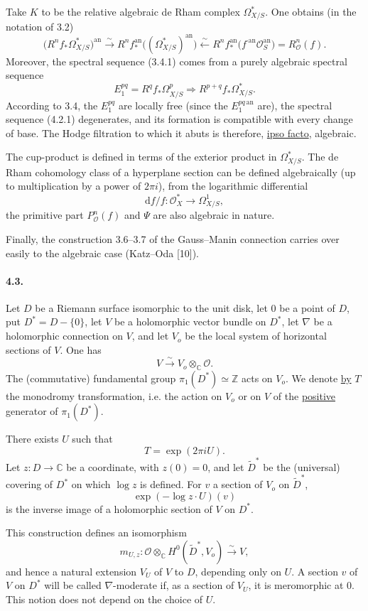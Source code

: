 \documentclass[10pt,leqno]{article}
\newcommand{\C}{\mathbb C}
\newcommand{\Z}{\mathbb Z}
\newcommand{\cO}{\mathcal O}
\theoremstyle{deligne}
\newcommand{\dd}{\mathrm d}
\renewcommand{\underline}[1]{\uline{#1}}
\begin{document}
Take $K$ to be the relative algebraic de Rham complex $\Omega^*_{X/S}$. One obtains (in the notation of 3.2)
\[
\bigl(R^n f_*\Omega^*_{X/S}\bigr)^{\mathrm{an}}
 \xrightarrow{\sim}
 R^n f_*^{\mathrm{an}}\bigl((\Omega^*_{X/S})^{\mathrm{an}}\bigr)
 \xleftarrow{\sim}
 R^n f_*^{\mathrm{an}}\bigl(f^{\cdot\mathrm{an}}\cO_S^{\mathrm{an}}\bigr)
 =
 R^n_{\cO}(f).
\]
Moreover, the spectral sequence (3.4.1) comes from a purely algebraic spectral sequence
\[
\tag{4.2.1}
E_1^{pq}=R^q f_*\Omega^p_{X/S}
\Longrightarrow
R^{p+q}f_*\Omega^*_{X/S}.
\]
According to 3.4, the $E_1^{pq}$ are locally free (since the $E_1^{pq\,\mathrm{an}}$ are), the spectral sequence (4.2.1) degenerates, and its formation is compatible with every change of base. The Hodge filtration to which it abuts is therefore, \underline{ipso facto}, algebraic.

The cup-product is defined in terms of the exterior product in $\Omega^*_{X/S}$. The de Rham cohomology class of a hyperplane section can be defined algebraically (up to multiplication by a power of $2\pi i$), from the logarithmic differential
\[
  \dd f/f:\cO_X^*\longrightarrow \Omega^1_{X/S},
\]
the primitive part $P^n_{\cO}(f)$ and $\Psi$ are also algebraic in nature.

Finally, the construction 3.6--3.7 of the Gauss--Manin connection carries over easily to the algebraic case (Katz--Oda [10]).

\paragraph{4.3.}
Let $D$ be a Riemann surface isomorphic to the unit disk, let $0$ be a point of $D$, put $D^*=D-\{0\}$, let $V$ be a holomorphic vector bundle on $D^*$, let $\nabla$ be a holomorphic connection on $V$, and let $V_o$ be the local system of horizontal sections of $V$. One has
\[
  V \xrightarrow{\sim} V_o\otimes_\C \cO .
\]
The (commutative) fundamental group $\pi_1(D^*)\simeq \Z$ acts on $V_o$. We denote \underline{by} $T$ the monodromy transformation, i.e. the action on $V_o$ or on $V$ of the \underline{positive} generator of $\pi_1(D^*)$.

There exists $U$ such that
\[
  T=\exp(2\pi iU).
\]
Let $z:D\to\C$ be a coordinate, with $z(0)=0$, and let $\widetilde D^*$ be the (universal) covering of $D^*$ on which $\log z$ is defined. For $v$ a section of $V_o$ on $\widetilde D^*$,
\[
  \exp(-\log z\cdot U)(v)
\]
is the inverse image of a holomorphic section of $V$ on $D^*$.

This construction defines an isomorphism
\[
  m_{U,z}:\cO\otimes_\C H^0(\widetilde D^*,V_o)
  \xrightarrow{\sim} V,
\]
and hence a natural extension $V_U$ of $V$ to $D$, depending only on $U$. A section $v$ of $V$ on $D^*$ will be called $\nabla$-moderate if, as a section of $V_U$, it is meromorphic at $0$. This notion does not depend on the choice of $U$.
\end{document}
